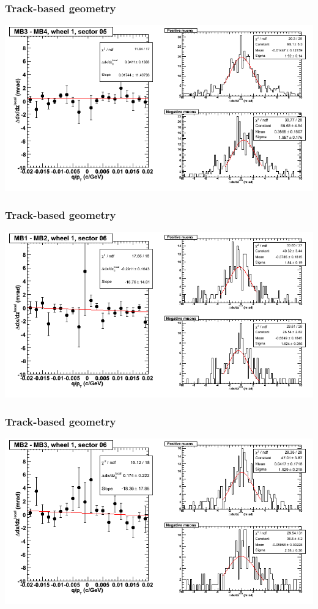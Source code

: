 \documentclass[compress]{beamer}
\begin{document}
\begin{frame}
\frametitle{Track-based geometry}
\includegraphics[width=\linewidth]{NOV4_segdiffs/dt13_slope_D_05_34.png}
\end{frame}

\begin{frame}
\frametitle{Track-based geometry}
\includegraphics[width=\linewidth]{NOV4_segdiffs/dt13_slope_D_06_12.png}
\end{frame}

\begin{frame}
\frametitle{Track-based geometry}
\includegraphics[width=\linewidth]{NOV4_segdiffs/dt13_slope_D_06_23.png}
\end{frame}
\end{document}
